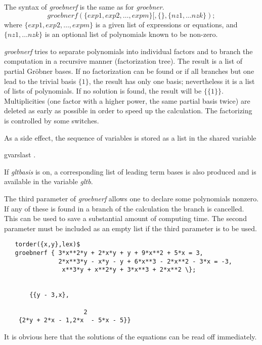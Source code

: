 
The syntax of \emph{groebnerf} is the same as for \emph{groebner}.
\[ \textit{groebnerf}(\{exp1, exp2, \ldots , expm\}
         [,\{\},\{nz1, \ldots nzk\}); \]
where $\{exp1, exp2, \ldots , expm\} $ is a given list of expressions or
equations, and $\{nz1, \ldots nzk\}$ is
an optional list of polynomials known to be non-zero.

\emph{groebnerf} tries to separate polynomials into individual factors and
to branch the computation in a recursive manner (factorization tree).
The result is a list of partial Gr\"obner bases. If no factorization can
be found or if all branches but one lead to the trivial basis $\{1\}$,
the result has only one basis; nevertheless it is a list of lists of
polynomials. If no solution is found, the result will be $\{\{1\}\}$.
Multiplicities (one factor with a higher power, the same partial basis
twice) are deleted as early as possible in order to speed up the
calculation. The factorizing is controlled by some switches.

As a side effect, the sequence of variables is stored as a \REDUCE list in
the shared variable
\begin{center}
gvarslast .
\end{center}
If \emph{gltbasis} is on, a corresponding list of leading term bases is
also produced and is available in the variable \emph{gltb}.

The third parameter of \emph{groebnerf} allows one to declare some polynomials
nonzero. If any of these is found in a branch of the calculation
the branch is cancelled. This can be used to save a substantial amount
of computing time. The second parameter must be included as an
empty list if the third parameter is to be used.

\begin{verbatim}
   torder({x,y},lex)$
   groebnerf { 3*x**2*y + 2*x*y + y + 9*x**2 + 5*x = 3,
               2*x**3*y - x*y - y + 6*x**3 - 2*x**2 - 3*x = -3,
                x**3*y + x**2*y + 3*x**3 + 2*x**2 \};


       {{y - 3,x},

                      2
    {2*y + 2*x - 1,2*x  - 5*x - 5}}
\end{verbatim}

It is obvious here that the solutions of the equations can be read
off immediately.

